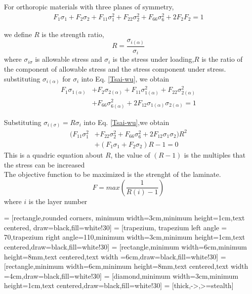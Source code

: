 \documentclass[smallextended]{svjour3}       %
\begin{document}
For orthoropic materials with three planes of symmetry, 
\begin{equation}\label{Tsai-wu}
	\begin{split}
		F_1\sigma_1+F_2\sigma_2+F_{11}\sigma_1^2+F_{22}\sigma_2^2+F_{66}\sigma_6^2+2F_2F_2=1
    \end{split}
\end{equation}

we define $R$ is the strength ratio,
\begin{equation}\label{strength-ratio}
    R=\frac{\sigma_{i(\alpha)}}{\sigma_i}
\end{equation}
where $\sigma_{i{\sigma}}$ is allowable stress and $\sigma_i$ is the stress under loading,$R$ is
the ratio of the component of allowable stress and the stress component under stress.
substituting $\sigma_{i(\alpha)}$ for $\sigma_i$ into Eq. \ref{Tsai-wu}, we obtain
\begin{equation}
	\begin{split}
		F_1\sigma_{1(\alpha)}&+F_2\sigma_{2(\alpha)}+F_{11}\sigma_{1(\alpha)}^2+F_{22}\sigma_{2(\alpha)}^2 \\
						&+F_{66}\sigma_{6(\alpha)}^2+2F_{12}\sigma_{1(\alpha)}\sigma_{2(\alpha)}=1
    \end{split}
\end{equation}

Substituting $\sigma_{i(\sigma)}=R\sigma_i$  into Eq. \ref{Tsai-wu},we obtain
\begin{equation}
	\begin{split}
		(F_{11}\sigma_1^2&+F_{22}\sigma_2^2+F_{66}\sigma_6^2+2F_{12}\sigma_1\sigma_2)R^2 \\
						 &+(F_1\sigma_1+F_2\sigma_2)R-1=0
	\end{split}
\end{equation}
This is a quadric equation about $R$, the value of $(R-1)$ is the multiples that the stress can be increased              \\
The objective function to be maximized is the strenght of the laminate.
\begin{equation}
	F=max(\frac{1}{R(i)-1})
\end{equation}
where $i$ is the layer number


 = [rectangle,rounded corners, minimum width=3cm,minimum height=1cm,text centered, draw=black,fill=white!30]
 = [trapezium, trapezium left angle = 70,trapezium right angle=110,minimum width=3cm,minimum height=1cm,text centered,draw=black,fill=white!30]
 = [rectangle,minimum width=6cm,minimum height=8mm,text centered,text width =6cm,draw=black,fill=white!30]
 = [rectangle,minimum width=6cm,minimum height=8mm,text centered,text width =4cm,draw=black,fill=white!30]
 = [diamond,minimum width=3cm,minimum height=1cm,text centered,draw=black,fill=white!30]
 = [thick,->,>=stealth]
\end{document}
